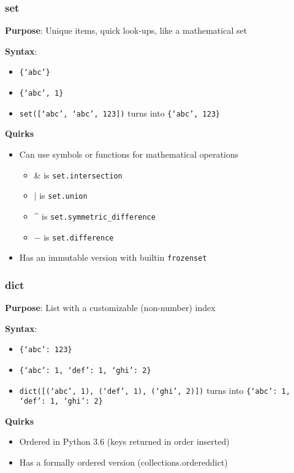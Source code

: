 \documentclass{beamer}
\begin{document}
\begin{frame}
  \frametitle{set} 

  \textbf{Purpose}: Unique items, quick look-ups, like a mathematical set

  \textbf{Syntax}: 
  \begin{itemize}
    \item \texttt{\{`abc'\}} 
    \item \texttt{\{`abc', 1\}}
    \item \texttt{set([`abc', `abc', 123])} turns into \texttt{\{`abc', 123\}}
  \end{itemize}

  \textbf{Quirks}
  \begin{itemize}
    \item Can use symbols or functions for mathematical operations
      \begin{itemize}
        \item \& is \texttt{set.intersection}
	\item $\vert$ is \texttt{set.union}
	\item \string^ is \texttt{set.symmetric\_difference}
	\item $-$ is \texttt{set.difference}
      \end{itemize}
    \item Has an immutable version with builtin \texttt{frozenset}
  \end{itemize}
\end{frame}

\begin{frame}
  \frametitle{dict}
 
  \textbf{Purpose}: List with a customizable (non-number) index

  \textbf{Syntax}: 
  \begin{itemize}
    \item \texttt{\{`abc': 123\}} 
    \item \texttt{\{`abc': 1, `def': 1, `ghi': 2\}}
    \item \texttt{dict([(`abc', 1), (`def', 1), (`ghi', 2)])}
          turns into \texttt{\{`abc': 1, `def': 1, `ghi': 2\}}
  \end{itemize}

  \textbf{Quirks}
  \begin{itemize}
    \item Ordered in Python 3.6 (keys returned in order inserted)
    \item Has a formally ordered version (collections.ordereddict)
  \end{itemize}
\end{frame}
\end{document}
